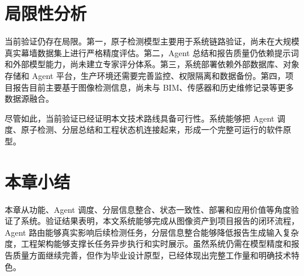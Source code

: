 \section{局限性分析}
\label{sec:validation-limitations}

当前验证仍存在局限。第一，原子检测模型主要用于系统链路验证，尚未在大规模真实幕墙数据集上进行严格精度评估。第二，Agent 总结和报告质量仍依赖提示词和外部模型能力，尚未建立专家评分体系。第三，系统部署依赖外部数据库、对象存储和 Agent 平台，生产环境还需要完善监控、权限隔离和数据备份。第四，项目报告目前主要基于图像检测信息，尚未与 BIM、传感器和历史维修记录等更多数据源融合。

尽管如此，当前验证已经证明本文技术路线具备可行性。系统能够把 Agent 调度、原子检测、分层总结和工程状态机连接起来，形成一个完整可运行的软件原型。

\section{本章小结}
\label{sec:validation-summary}

本章从功能、Agent 调度、分层信息整合、状态一致性、部署和应用价值等角度验证了系统。验证结果表明，本文系统能够完成从图像资产到项目报告的闭环流程，Agent 路由能够真实影响后续检测任务，分层信息整合能够降低报告生成输入复杂度，工程架构能够支撑长任务异步执行和实时展示。虽然系统仍需在模型精度和报告质量方面继续完善，但作为毕业设计原型，已经体现出完整工作量和明确技术特色。
